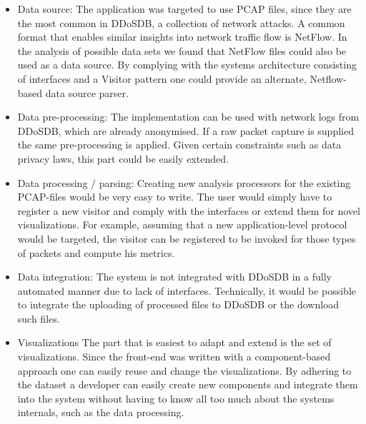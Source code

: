\begin{itemize}

    \item Data source: The application was targeted to use PCAP files, since they are the most common in DDoSDB, a collection of network attacks. A common format that enables similar insights into network traffic flow is NetFlow. In the analysis of possible data sets we found that NetFlow files could also be used as a data source. By complying with the systems architecture consisting of interfaces and a Visitor pattern one could provide an alternate, Netflow-based data source parser.
    
    \item Data pre-processing: The implementation can be used with network logs from DDoSDB, which are already anonymised. If a raw packet capture is supplied the same pre-processing is applied. Given certain constraints such as data privacy laws, this part could be easily extended.
    
    \item Data processing / parsing:
    Creating new analysis processors for the existing PCAP-files would be very easy to write. The user would simply have to register a new visitor and comply with the interfaces or extend them for novel visualizations. For example, assuming that a new application-level protocol would be targeted, the visitor can be registered to be invoked for those types of packets and compute his metrics.
   
    \item Data integration:
    The system is not integrated with DDoSDB in a fully automated manner due to lack of interfaces. Technically, it would be possible to integrate the uploading  of processed files to DDoSDB or the download such files.
    
    \item Visualizations
    The part that is easiest to adapt and extend is the set of visualizations. Since the front-end was written with a component-based approach one can easily reuse and change the visualizations. By adhering to the dataset a developer can easily create new components and integrate them into the system without having to know all too much about the systems internals, such as the data processing.
\end{itemize}